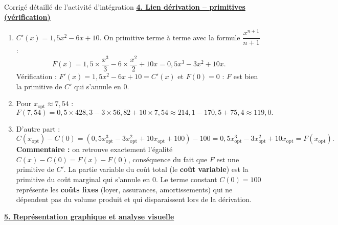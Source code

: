 \documentclass[11pt]{article}
\begin{document}
\begin{exoresolu}{Corrigé détaillé de l'activité d'intégration}
\underline{\textbf{4. Lien dérivation -- primitives (vérification)}}

\begin{enumerate}
    \item $C'(x) = 1,5x^{2} - 6x + 10$. On primitive terme à terme avec la formule $\dfrac{x^{n+1}}{n+1}$ :
    \[
    F(x) = 1,5 \times \frac{x^{3}}{3} - 6 \times \frac{x^{2}}{2} + 10x = 0,5x^{3} - 3x^{2} + 10x.
    \]
    Vérification : $F'(x) = 1,5x^{2} - 6x + 10 = C'(x)$ et $F(0) = 0$ : $F$ est bien la primitive de $C'$ qui s'annule en $0$.
    \item Pour $x_{\text{opt}} \approx 7,54$ :
    \[
    F(7,54) = 0,5 \times 428,3 - 3 \times 56,82 + 10 \times 7,54 \approx 214,1 - 170,5 + 75,4 \approx 119,0.
    \]
    \item D'autre part :
    \[
    C(x_{\text{opt}}) - C(0) = \left(0,5x_{\text{opt}}^{3} - 3x_{\text{opt}}^{2} + 10x_{\text{opt}} + 100\right) - 100 = 0,5x_{\text{opt}}^{3} - 3x_{\text{opt}}^{2} + 10x_{\text{opt}} = F(x_{\text{opt}}).
    \]
    \textbf{Commentaire :} on retrouve exactement l'égalité $C(x) - C(0) = F(x) - F(0)$, conséquence du fait que $F$ est une primitive de $C'$. La partie variable du coût total (le \textbf{coût variable}) est la primitive du coût marginal qui s'annule en $0$. Le terme constant $C(0) = 100$ représente les \textbf{coûts fixes} (loyer, assurances, amortissements) qui ne dépendent pas du volume produit et qui disparaissent lors de la dérivation.
\end{enumerate}

\underline{\textbf{5. Représentation graphique et analyse visuelle}}

\begin{popfigure}
\end{popfigure}
\end{exoresolu}
\end{document}
